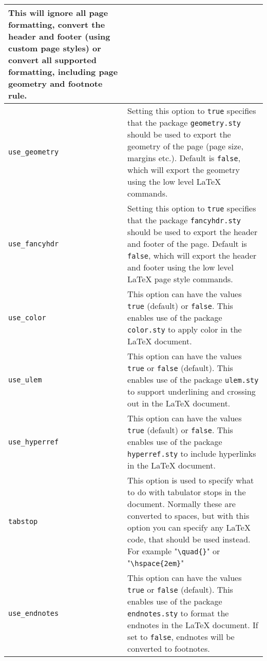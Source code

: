 \documentclass{article}
\newcommand\textstyleSourceText[1]{\texttt{\textmd{#1}}}
\begin{document}
\begin{center}
\begin{tabular}{|m{3.8479998cm}|m{12.765cm}|}
{\mdseries This will ignore all page formatting, convert the header and footer (using custom page styles) or convert all supported formatting, including page geometry and footnote rule.}\\\hline
{\mdseries \textstyleSourceText{use\_geometry}} &
{\mdseries Setting this option to \textstyleSourceText{true} specifies that the package \textstyleSourceText{geometry.sty} should be used to export the geometry of the page (page size, margins etc.). Default is \textstyleSourceText{false}, which will export the geometry using the low level LaTeX commands.}\\\hline
{\mdseries \textstyleSourceText{use\_fancyhdr}} &
{\mdseries Setting this option to \textstyleSourceText{true} specifies that the package \textstyleSourceText{fancyhdr.sty} should be used to export the header and footer of the page. Default is \textstyleSourceText{false}, which will export the header and footer using the low level LaTeX page style commands.}\\\hline
{\mdseries \textstyleSourceText{use\_color}} &
{\mdseries This option can have the values \textstyleSourceText{true} (default) or \textstyleSourceText{false}. This enables use of the package \textstyleSourceText{color.sty} to apply color in the LaTeX document.}\\\hline
{\mdseries \textstyleSourceText{use\_ulem}} &
{\mdseries This option can have the values \textstyleSourceText{true} or \textstyleSourceText{false} (default). This enables use of the package \textstyleSourceText{ulem.sty} to support underlining and crossing out in the LaTeX document.}\\\hline
{\mdseries \textstyleSourceText{use\_hyperref}} &
{\mdseries This option can have the values \textstyleSourceText{true} (default) or \textstyleSourceText{false}. This enables use of the package \textstyleSourceText{hyperref.sty} to include hyperlinks in the LaTeX document.}\\\hline
{\mdseries \textstyleSourceText{tabstop}} &
{\mdseries This option is used to specify what to do with tabulator stops in the document. Normally these are converted to spaces, but with this option you can specify any LaTeX code, that should be used instead. For example "\textstyleSourceText{{\textbackslash}quad\{\}}" or "\textstyleSourceText{{\textbackslash}hspace\{2em\}}"}\\\hline
{\mdseries \textstyleSourceText{use\_endnotes}} &
{\mdseries This option can have the values \textstyleSourceText{true} or \textstyleSourceText{false} (default). This enables use of the package \textstyleSourceText{endnotes.sty} to format the endnotes in the LaTeX document. If set to \textstyleSourceText{false}, endnotes will be converted to footnotes.}\\\hline
\end{tabular}
\end{center}
\end{document}
